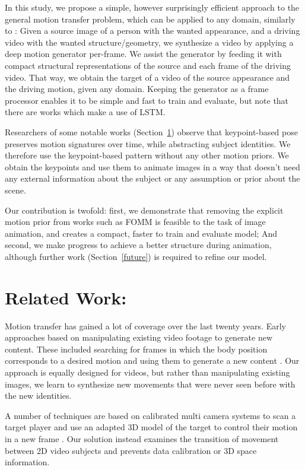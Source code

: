 \documentclass{article}
\begin{document}
In this study, we propose a simple, however surprisingly efficient approach
to the general motion transfer problem, which can be
applied to any domain, similarly to \cite{siarohin2019animating}:
Given a source image of a person with the wanted appearance,
and a driving video with the wanted structure/geometry,
we synthesize a video by applying a deep motion generator per-frame. We
assist the generator by feeding it with compact structural representations
of the source and each frame of the driving video. That way, we obtain the
target of a video of the source appearance and the driving motion, given
any domain. Keeping the generator as a frame processor enables it to be
simple and fast to train and evaluate, but note that there are works
\cite{villegas2017learning} which make a use of LSTM.

Researchers of some notable works (Section~\ref{related}) observe that
keypoint-based pose preserves motion signatures over time, while
abstracting subject identities. We therefore use the keypoint-based pattern
without any other motion priors. We obtain the keypoints and use them to
animate images in a way that doesn't need any external information about the
subject or any assumption or prior about the scene.

Our contribution is twofold: first, we demonstrate that removing the
explicit motion prior from works such as FOMM is feasible to the task of
image animation, and creates a compact, faster to train and evaluate model;
And second, we make progress to achieve a better structure during
animation, although further work (Section~\ref{future}) is required to
refine our model.

\medskip

\section{Related Work:}
\label{related}
Motion transfer has gained a lot of coverage over the last twenty years.
Early approaches based on manipulating existing video footage to generate
new content. These included searching for frames in which the body position
corresponds to a desired motion and using them to generate a new
content \cite{bregler1997video}. Our approach is equally designed for videos,
but rather than manipulating existing images, we learn to synthesize new
movements that were never seen before with the new identities.

A number of techniques are based on calibrated multi camera systems to scan
a target player and use an adapted 3D model of the target to control their
motion in a new frame \cite{cheung2004markerless}. Our solution instead
examines the transition of movement between 2D video subjects and prevents
data calibration or 3D space information.
\end{document}
